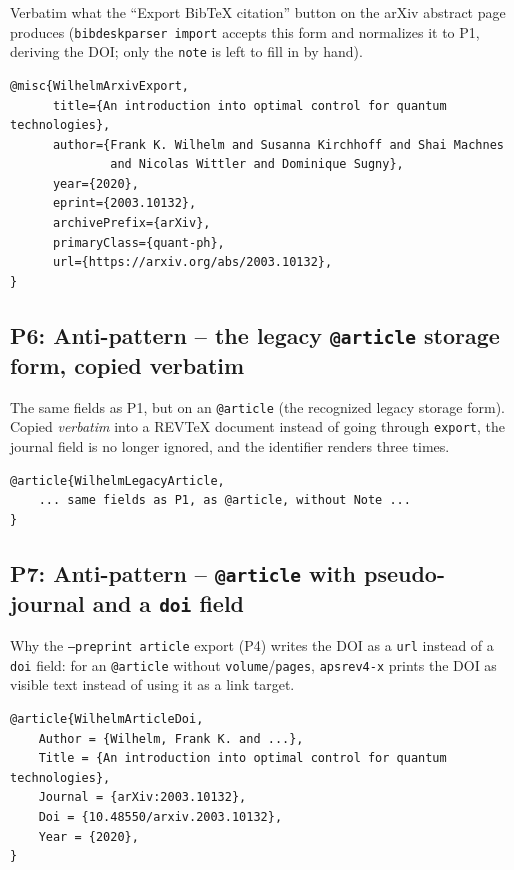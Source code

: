 \documentclass[onecolumn, amsmath, amssymb, aps, pra]{revtex4-2}
\begin{document}
Verbatim what the ``Export BibTeX citation'' button on the arXiv abstract
page produces (\texttt{bibdeskparser import} accepts this form and
normalizes it to P1, deriving the DOI; only the \texttt{note} is left
to fill in by hand).

\begin{Verbatim}
@misc{WilhelmArxivExport,
      title={An introduction into optimal control for quantum technologies},
      author={Frank K. Wilhelm and Susanna Kirchhoff and Shai Machnes
              and Nicolas Wittler and Dominique Sugny},
      year={2020},
      eprint={2003.10132},
      archivePrefix={arXiv},
      primaryClass={quant-ph},
      url={https://arxiv.org/abs/2003.10132},
}
\end{Verbatim}

\subsection{P6: Anti-pattern -- the legacy \texttt{@article} storage
form, copied verbatim~\cite{WilhelmLegacyArticle}}

The same fields as P1, but on an \texttt{@article} (the recognized legacy
storage form). Copied \emph{verbatim} into a REVTeX document instead of
going through \texttt{export}, the journal field is no longer ignored, and
the identifier renders three times.

\begin{Verbatim}
@article{WilhelmLegacyArticle,
    ... same fields as P1, as @article, without Note ...
}
\end{Verbatim}

\subsection{P7: Anti-pattern -- \texttt{@article} with pseudo-journal
and a \texttt{doi} field~\cite{WilhelmArticleDoi}}

Why the \texttt{--preprint article} export (P4) writes the DOI as a
\texttt{url} instead of a \texttt{doi} field: for an \texttt{@article}
without \texttt{volume}/\texttt{pages}, \texttt{apsrev4-x} prints the DOI
as visible text instead of using it as a link target.

\begin{Verbatim}
@article{WilhelmArticleDoi,
    Author = {Wilhelm, Frank K. and ...},
    Title = {An introduction into optimal control for quantum technologies},
    Journal = {arXiv:2003.10132},
    Doi = {10.48550/arxiv.2003.10132},
    Year = {2020},
}
\end{Verbatim}
\end{document}
